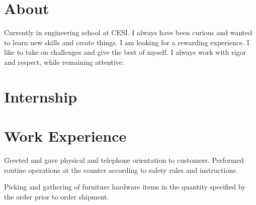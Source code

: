 \documentclass[a4paper,table]{twentysecondcv}
\begin{document}
\section{About}

Currently in engineering school at CESI. I always have been curious and wanted to learn new skills and create things. I am looking for a rewarding experience. I like to take on challenges and give the best of myself. I always work with rigor and respect, while remaining attentive.

\section{Internship}

\begin{twenty}


\end{twenty}

\vspace{-0.4cm}

\section{Work Experience}

\begin{twenty}

{Greeted and gave physical and telephone orientation to customers. Performed routine operations at the counter according to safety rules and instructions.}

{Picking and gathering of furniture hardware items in the quantity specified by the order prior to order shipment.}


\end{twenty}

\vspace{-0.4cm}
\end{document}
